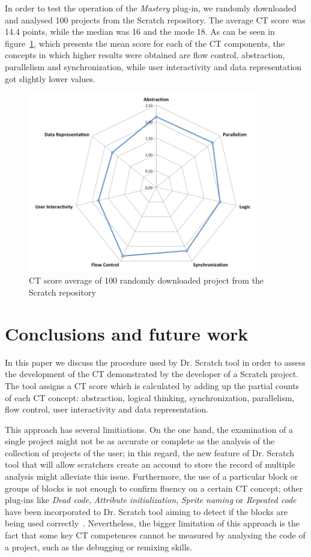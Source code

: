 \documentclass[a4paper,11pt]{article}
\begin{document}
In order to test the operation of the \textit{Mastery} plug-in, we randomly downloaded and analysed 100 projects from the Scratch repository. The average CT score was 14.4 points, while the median was 16 and the mode 18. As can be seen in figure~\ref{fig:scores}, which presents the mean score for each of the CT components, the concepts in which higher results were obtained are flow control, abstraction, parallelism and synchronization, while user interactivity and data representation got slightly lower values.
\begin{figure}
  \centering
    \includegraphics[width=10cm]{img/spider.png}
    \caption{CT score average of 100 randomly downloaded project from the Scratch repository}
    \label{fig:scores}
\end{figure}

\section{Conclusions and future work}
\label{sec:conclusions}
In this paper we discuss the procedure used by Dr. Scratch tool in order to assess the development of the CT demonstrated by the developer of a Scratch project. The tool assigns a CT score which is calculated by adding up the partial counts of each CT concept: abstraction, logical thinking, synchronization, parallelism, flow control, user interactivity and data representation.

This approach has several limitiations. On the one hand, the examination of a single project might not be as accurate or complete as the analysis of the collection of projects of the user; in this regard, the new feature of Dr. Scratch tool that will allow scratchers create an account to store the record of multiple analysis might alleviate this issue. Furthermore, the use of a particular block or groups of blocks is not enough to confirm fluency on a certain CT concept; other plug-ins like \textit{Dead code}, \textit{Attribute initialization}, \textit{Sprite naming} or \textit{Repeated code} have been incorporated to Dr. Scratch tool aiming to detect if the blocks are being used correctly~\cite{moreno2014automatic}. Nevertheless, the bigger limitation of this approach is the fact that some key CT competences cannot be measured by analysing the code of a project, such as the debugging or remixing skills. 
\end{document}
